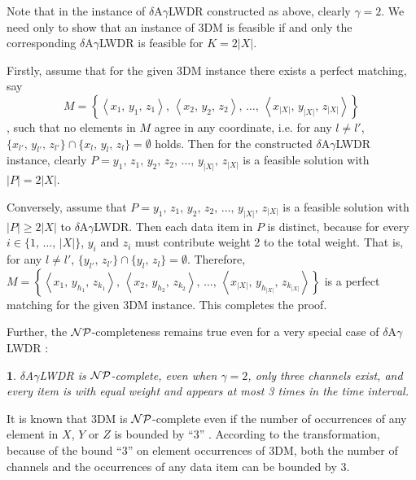 \documentclass[11pt,english,onecolumn,draftcls]{IEEEtran}
\theoremstyle{plain}
\theoremstyle{plain}
\theoremstyle{plain}
\theoremstyle{plain}
\newtheorem{cor}[thm]{\protect\corollaryname}
\providecommand{\corollaryname}{Corollary}
\begin{document}
\begin{IEEEproof}
Note that in the instance of $\delta$A$\gamma$LWDR constructed as
above, clearly $\gamma=2$. We need only to show that an instance
of 3DM is feasible if and only the corresponding $\delta$A$\gamma$LWDR
is feasible for $K=2\vert X\vert$.

Firstly, assume that for the given 3DM instance there exists a perfect
matching, say \[M=\left\{ \left\langle x_{1},\, y_{1},\, z_{1}\right\rangle ,\,\left\langle x_{2},\, y_{2},\, z_{2}\right\rangle ,\,\dots,\,\left\langle x_{|X|},\, y_{|X|},\, z_{|X|}\right\rangle \right\} \],
such that no elements in $M$ agree in any coordinate, i.e. for any
$l\neq l'$, $\{x_{l'},\, y_{l'},\, z_{l'}\}\cap\{x_{l},\, y_{l},\, z_{l}\}=\emptyset$
holds. Then for the constructed $\delta$A$\gamma$LWDR instance,
clearly $P=y_{1},\, z_{1},\, y_{2},\, z_{2},\,\dots,\, y_{|X|},\, z_{|X|}$
is a feasible solution with $\vert P\vert=2|X|$.

Conversely, assume that $P=y_{1},\, z_{1},\, y_{2},\, z_{2},\,\dots,\, y_{|X|},\, z_{|X|}$
is a feasible solution with $\vert P\vert\geq2|X|$ to $\delta$A$\gamma$LWDR.
Then each data item in $P$ is distinct, because for every $i\in\{1,\,\dots,\,|X|\}$,
$y_{i}$ and $z_{i}$ must contribute weight 2 to the total weight.
That is, for any $l\neq l'$, $\{y_{l'},\, z_{l'}\}\cap\{y_{l},\, z_{l}\}=\emptyset$.
Therefore, $M=\left\{ \left\langle x_{1},\, y_{h_{1}},\, z_{k_{1}}\right\rangle ,\,\left\langle x_{2},\, y_{h_{2}},\, z_{k_{2}}\right\rangle ,\,\dots,\,\left\langle x_{|X|},\, y_{h_{|X|}},\, z_{k_{|X|}}\right\rangle \right\} $
is a perfect matching for the given 3DM instance. This completes the
proof.
\end{IEEEproof}
Further, the ${\cal NP}$-completeness remains true even for a very
special case of $\delta$A$\gamma$LWDR :
\begin{cor}
$\delta$A$\gamma$LWDR is ${\cal NP}$-complete, even when $\gamma=2$,
only three channels exist, and every item is with equal weight and
appears at most 3 times in the time interval.\end{cor}
\begin{IEEEproof}
It is known that 3DM is ${\cal NP}$-complete even if the number of
occurrences of any element in $X$, $Y$ or $Z$ is bounded by ``3''
\cite{kann1991maximum}. According to the transformation, because
of the bound ``3'' on element occurrences of 3DM, both the number
of channels and the occurrences of any data item can be bounded by
3.
\end{IEEEproof}
\end{document}
